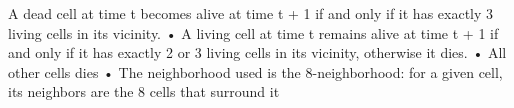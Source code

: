 A dead cell at time t becomes alive at time t + 1 if and only if it has exactly 3 living cells in its vicinity. • A living cell at time t remains alive at time t + 1 if and only if it has exactly 2 or 3 living cells in its vicinity, otherwise it dies. • All other cells dies • The neighborhood used is the 8-\/neighborhood\+: for a given cell, its neighbors are the 8 cells that surround it 